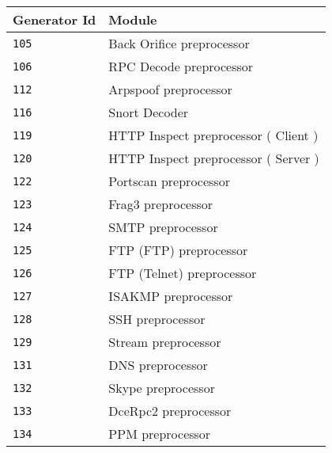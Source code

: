 \documentclass[english]{report}
\begin{document}
\begin{table}[h]
\begin{center}
\begin{tabular}{| l | l |}

\hline
\textbf{Generator Id} & \textbf{Module}\\
\hline

\hline
\texttt{105} & Back Orifice preprocessor \\

\hline
\texttt{106} & RPC Decode preprocessor \\

\hline
\texttt{112} & Arpspoof preprocessor \\

\hline
\texttt{116} & Snort Decoder \\

\hline
\texttt{119} & HTTP Inspect preprocessor ( Client ) \\

\hline
\texttt{120} & HTTP Inspect preprocessor ( Server ) \\

\hline
\texttt{122} & Portscan preprocessor \\

\hline
\texttt{123} & Frag3 preprocessor \\

\hline
\texttt{124} & SMTP preprocessor \\

\hline
\texttt{125} & FTP (FTP) preprocessor \\

\hline
\texttt{126} & FTP (Telnet) preprocessor \\

\hline
\texttt{127} & ISAKMP preprocessor \\

\hline
\texttt{128} & SSH preprocessor \\

\hline
\texttt{129} & Stream preprocessor \\

\hline
\texttt{131} & DNS preprocessor \\

\hline
\texttt{132} & Skype preprocessor \\

\hline
\texttt{133} & DceRpc2 preprocessor \\

\hline
\texttt{134} & PPM preprocessor \\


\end{tabular}
\end{center}
\end{table}
\end{document}

